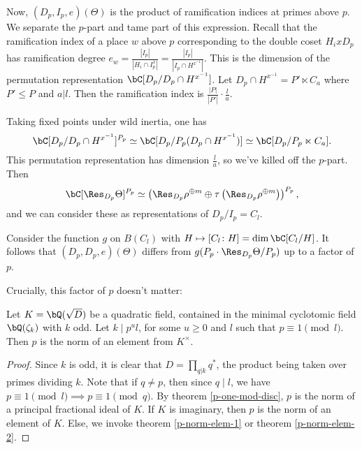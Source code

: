 Now, $(D_p, I_p, e)(\Theta)$ is the product of ramification indices at primes above $p$. We separate the $p$-part and tame part of this expression.
Recall that the ramification index of a place $w$ above $p$ corresponding to the double coset $H_i x D_p$ has ramification degree $e_w = \frac{|I_p|}{|H_i \cap I_p^x|} =\frac{|I_p|}{|I_p \cap H^{x^{-1}}|}$.
This is the dimension of the permutation representation $\bC[D_p / D_p \cap H^{x^{-1}}]$.
Let  $D_p \cap H^{x^{-1}} = P' \ltimes C_a$ where $P' \leq P$ and $a | l$. Then the ramification index is $\frac{|P|}{|P'|}\cdot \frac{l}{a}$. 

Taking fixed points under wild inertia, one has $$\bC[D_p / D_p \cap H^{x^{-1}}]^{P_p} \simeq \bC[D_p / P_p (D_p \cap H^{x^{-1}})] \simeq \bC[D_p / P_p \ltimes C_a].$$ This permutation representation has dimension $\frac{l}{a}$, so we've killed off the $p$-part. 
Then $$\bC[\Res_{D_p} \Theta]^{P_p} \simeq \left(\Res_{D_p} \rho^{\oplus m} \oplus \tau\left(\Res_{D_p}\rho^{\oplus m}\right)\right)^{P_p},$$
and we can consider these as representations of $D_p / I_p = C_l$.

Consider the function $g$ on $B(C_l)$ with $H \mapsto [C_l \colon H] = \dim \bC[C_l / H]$. 
It follows that $(D_p, D_p, e)(\Theta)$ differs from $g(P_p \cdot \Res_{D_p}\Theta / P_p)$ up to a factor of $p$. 


Crucially, this factor of $p$ doesn't matter:

\begin{lemma}
    Let $K = \bQ(\sqrt{D})$ be a quadratic field, contained in the minimal cyclotomic field $\bQ(\zeta_k)$ with $k$ odd. Let $k \mid p^u l $, for some $u \geq 0$ and $l$ such that $p \equiv 1 \pmod l$. Then $p$ is the norm of an element from $K^{\times}$.
\end{lemma}

\begin{proof}
    Since $k$ is odd, it is clear that $D = \prod_{q | k} q^*$, the product being taken over primes dividing $k$. Note that if $q \not= p$, then since $q \mid l$, we have $p \equiv 1 \pmod l \implies p \equiv 1 \pmod q$. By theorem \ref{p-one-mod-disc},  $p$ is the norm of a principal fractional ideal of $K$. If $K$ is imaginary, then $p$ is the norm of an element of $K$. Else, we invoke theorem \ref{p-norm-elem-1} or theorem \ref{p-norm-elem-2}.
\end{proof}

